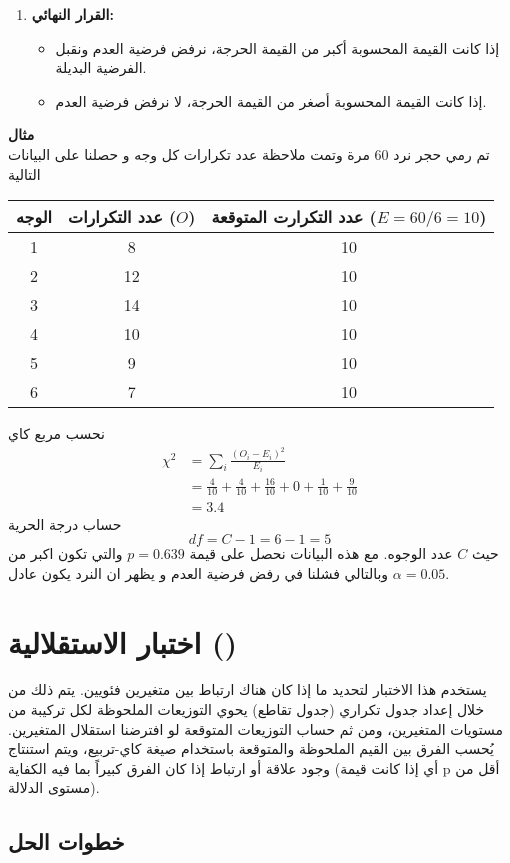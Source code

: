 \begin{enumerate}
	\item \textbf{القرار النهائي:}
	\begin{itemize}
		\item إذا كانت القيمة المحسوبة أكبر من القيمة الحرجة، نرفض فرضية العدم ونقبل الفرضية البديلة.
		\item إذا كانت القيمة المحسوبة أصغر من القيمة الحرجة، لا نرفض فرضية العدم.
	\end{itemize}
\end{enumerate}
\noindent
\textbf{مثال}\\
تم رمي حجر نرد 60 مرة وتمت ملاحظة عدد تكرارات كل وجه و حصلنا على البيانات التالية
\begin{table}[H]
	\centering
	\begin{tabular}{|c|c|c|}
		\hline
		الوجه & عدد التكرارات ($O$) & عدد التكرارت المتوقعة ($E=60/6=10$)\\
		\hline
		1 & 8&10 \\
		2 &12&10\\
		3&14&10\\
		4&10&10\\
		5&9&10\\
		6&7&10\\
		\hline
	\end{tabular}
\end{table}
نحسب مربع كاي
\begin{align*}
	\chi^2 &= \sum_i \frac{(O_i - E_i)^2}{E_i} \\
	&= \frac{4}{10} + \frac{4}{10} + \frac{16}{10} + 0 + \frac{1}{10} + \frac{9}{10}\\
	&= 3.4
\end{align*}
حساب درجة الحرية 
\[
df = C -1 = 6-1 = 5
\]
حيث $C$ عدد الوجوه. مع هذه البيانات نحصل على قيمة $p = 0.639$ والتي تكون اكبر من $\alpha = 0.05$ وبالتالي فشلنا في رفض فرضية العدم و يظهر ان النرد يكون عادل.  

\section{اختبار الاستقلالية ()}
يستخدم هذا الاختبار لتحديد ما إذا كان هناك ارتباط بين متغيرين فئويين. يتم ذلك من خلال إعداد جدول تكراري (جدول تقاطع) يحوي التوزيعات الملحوظة لكل تركيبة من مستويات المتغيرين، ومن ثم حساب التوزيعات المتوقعة لو افترضنا استقلال المتغيرين. يُحسب الفرق بين القيم الملحوظة والمتوقعة باستخدام صيغة كاي-تربيع، ويتم استنتاج وجود علاقة أو ارتباط إذا كان الفرق كبيراً بما فيه الكفاية (أي إذا كانت قيمة p أقل من مستوى الدلالة). 

\subsection*{خطوات الحل}

